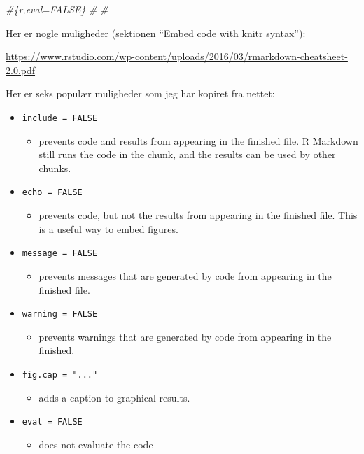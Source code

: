 \documentclass[
]{book}
\newenvironment{Shaded}{\begin{snugshade}}{\end{snugshade}}
\newcommand{\CommentTok}[1]{\textcolor[rgb]{0.56,0.35,0.01}{\textit{#1}}}
\providecommand{\tightlist}{%
  \setlength{\itemsep}{0pt}\setlength{\parskip}{0pt}}
\begin{document}
\begin{Shaded}
\begin{Highlighting}[]
\CommentTok{\#\textasciigrave{}\textasciigrave{}\textasciigrave{}\{r,eval=FALSE\}}
\CommentTok{\#}
\CommentTok{\#\textasciigrave{}\textasciigrave{}\textasciigrave{}}
\end{Highlighting}
\end{Shaded}

Her er nogle muligheder (sektionen ``Embed code with knitr syntax''):

\url{https://www.rstudio.com/wp-content/uploads/2016/03/rmarkdown-cheatsheet-2.0.pdf}

Her er seks populær muligheder som jeg har kopiret fra nettet:

\begin{itemize}
\tightlist
\item
  \texttt{include\ =\ FALSE}

  \begin{itemize}
  \tightlist
  \item
    prevents code and results from appearing in the finished file. R Markdown still runs the code in the chunk, and the results can be used by other chunks.
  \end{itemize}
\item
  \texttt{echo\ =\ FALSE}

  \begin{itemize}
  \tightlist
  \item
    prevents code, but not the results from appearing in the finished file. This is a useful way to embed figures.
  \end{itemize}
\item
  \texttt{message\ =\ FALSE}

  \begin{itemize}
  \tightlist
  \item
    prevents messages that are generated by code from appearing in the finished file.
  \end{itemize}
\item
  \texttt{warning\ =\ FALSE}

  \begin{itemize}
  \tightlist
  \item
    prevents warnings that are generated by code from appearing in the finished.
  \end{itemize}
\item
  \texttt{fig.cap\ =\ "..."}

  \begin{itemize}
  \tightlist
  \item
    adds a caption to graphical results.
  \end{itemize}
\item
  \texttt{eval\ =\ FALSE}

  \begin{itemize}
  \tightlist
  \item
    does not evaluate the code
  \end{itemize}
\end{itemize}
\end{document}
